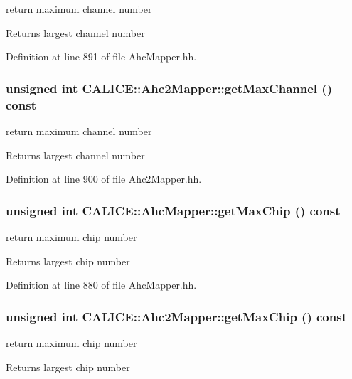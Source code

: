 return maximum channel number \begin{DoxyReturn}{Returns}
largest channel number 
\end{DoxyReturn}


Definition at line 891 of file AhcMapper.hh.
\subsubsection[{getMaxChannel}]{\setlength{\rightskip}{0pt plus 5cm}unsigned int CALICE::Ahc2Mapper::getMaxChannel () const\hspace{0.3cm}{\ttfamily  [inline, inherited]}}\label{group__Range_ga856529fcaf100f6d61df791bfd19ff60}


return maximum channel number \begin{DoxyReturn}{Returns}
largest channel number 
\end{DoxyReturn}


Definition at line 900 of file Ahc2Mapper.hh.
\subsubsection[{getMaxChip}]{\setlength{\rightskip}{0pt plus 5cm}unsigned int CALICE::AhcMapper::getMaxChip () const\hspace{0.3cm}{\ttfamily  [inline, inherited]}}\label{group__Range_ga9cf146635945e09489d263d5ffd5ab0b}


return maximum chip number \begin{DoxyReturn}{Returns}
largest chip number 
\end{DoxyReturn}


Definition at line 880 of file AhcMapper.hh.
\subsubsection[{getMaxChip}]{\setlength{\rightskip}{0pt plus 5cm}unsigned int CALICE::Ahc2Mapper::getMaxChip () const\hspace{0.3cm}{\ttfamily  [inline, inherited]}}\label{group__Range_ga08fb8cac6c3c878e73c0b5d6f0066fb3}


return maximum chip number \begin{DoxyReturn}{Returns}
largest chip number 
\end{DoxyReturn}


